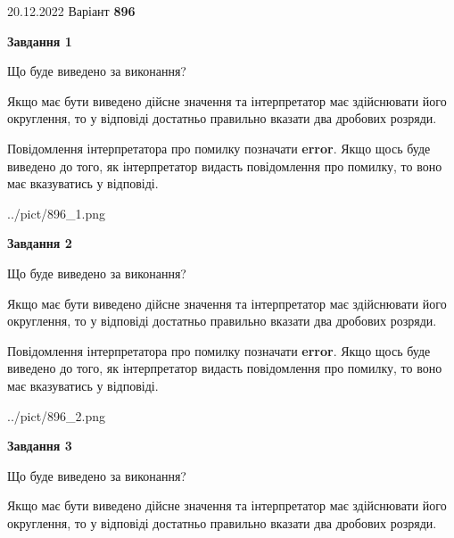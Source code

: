 \documentclass[12pt, ukrainian]{article}
\begin{document}
{20.12.2022 Варіант \No \textbf { 896 }\par}
{
\begin {Large}

{\begin {center}\textbf{Завдання 1}\end {center}}\par
Що буде виведено за виконання? \par

Якщо має бути виведено дійсне значення та інтерпретатор має здійснювати його округлення, 
то у відповіді достатньо правильно вказати два дробових розряди.

Повідомлення інтерпретатора про помилку позначати \textbf{error}.
Якщо щось буде виведено до того, як інтерпретатор видасть повідомлення про помилку, 
то воно має вказуватись у відповіді. \par

\begin{center}
	{../pict/896_1.png}
\end{center}
\newpage

{\begin {center}\textbf{Завдання 2}\end {center}}\par
Що буде виведено за виконання? \par

Якщо має бути виведено дійсне значення та інтерпретатор має здійснювати його округлення, 
то у відповіді достатньо правильно вказати два дробових розряди.

Повідомлення інтерпретатора про помилку позначати \textbf{error}.
Якщо щось буде виведено до того, як інтерпретатор видасть повідомлення про помилку, 
то воно має вказуватись у відповіді. \par

\begin{center}
	{../pict/896_2.png}
\end{center}
\newpage

{\begin {center}\textbf{Завдання 3}\end {center}}\par
Що буде виведено за виконання? \par

Якщо має бути виведено дійсне значення та інтерпретатор має здійснювати його округлення, 
то у відповіді достатньо правильно вказати два дробових розряди.


\end{Large}}
\end{document}
